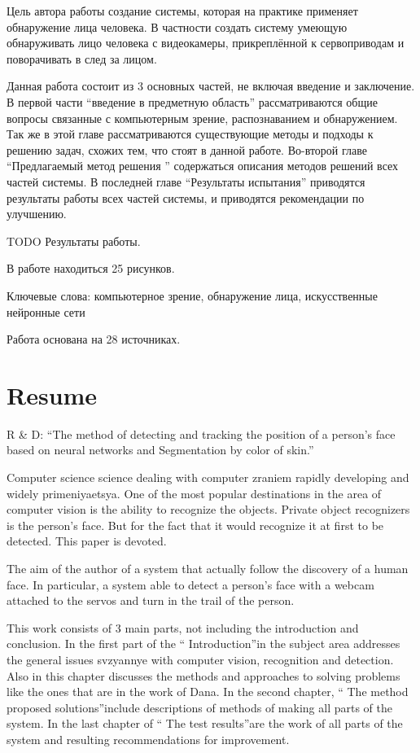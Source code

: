 \documentclass[12pt]{report}
\begin{document}
Цель автора работы создание системы, которая на практике применяет обнаружение лица человека. В частности создать систему умеющую обнаруживать лицо человека с видеокамеры, прикреплённой к сервоприводам и поворачивать в след за лицом.

Данная работа состоит из 3 основных частей, не включая введение и заключение. В первой части ``введение в предметную область'' рассматриваются общие вопросы связанные с компьютерным зрение, распознаванием и обнаружением. Так же в этой главе рассматриваются существующие методы и подходы к решению задач, схожих тем, что стоят в данной работе. Во-второй главе ``Предлагаемый метод решения '' содержаться описания методов решений всех частей системы. В последней главе ``Результаты испытания'' приводятся результаты работы всех частей системы, и приводятся рекомендации по улучшению.

TODO Результаты работы.

В работе находиться 25 рисунков.

Ключевые слова: компьютерное зрение, обнаружение лица, искусственные нейронные сети

Работа основана на 28 источниках.

\chapter*{Resume}
\thispagestyle{fancy}

R \& D: ``The method of detecting and tracking the position of a person's face based on neural networks and
Segmentation by color of skin.''

Computer science science dealing with computer zraniem rapidly developing and widely primeniyaetsya. One of the most popular destinations in the area of ​​computer vision is the ability to recognize the objects. Private object recognizers is the person's face. But for the fact that it would recognize it at first to be detected. This paper is devoted.

The aim of the author of a system that actually follow the discovery of a human face. In particular, a system able to detect a person's face with a webcam attached to the servos and turn in the trail of the person.

This work consists of 3 main parts, not including the introduction and conclusion. In the first part of the `` Introduction''in the subject area addresses the general issues svzyannye with computer vision, recognition and detection. Also in this chapter discusses the methods and approaches to solving problems like the ones that are in the work of Dana. In the second chapter, `` The method proposed solutions''include descriptions of methods of making all parts of the system. In the last chapter of `` The test results''are the work of all parts of the system and resulting recommendations for improvement.
\end{document}
